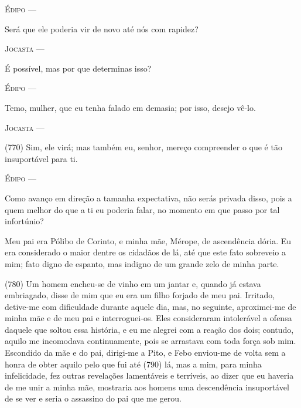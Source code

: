 \textsc{Édipo} ---

Será que ele poderia vir de novo até nós com rapidez?

\textsc{Jocasta} ---

É possível, mas por que determinas isso?

\textsc{Édipo} ---

Temo, mulher, que eu tenha falado em demasia; por isso, desejo vê-lo.

\textsc{Jocasta} ---

(770) Sim, ele virá; mas também eu, senhor, mereço compreender o que é
tão insuportável para ti.

\textsc{Édipo} ---

Como avanço em direção a tamanha expectativa, não serás privada disso,
pois a quem melhor do que a ti eu poderia falar, no momento em que passo
por tal infortúnio?

Meu pai era Pólibo de Corinto, e minha mãe, Mérope, de ascendência
dória. Eu era considerado o maior dentre os cidadãos de lá, até que este
fato sobreveio a mim; fato digno de espanto, mas indigno de um grande
zelo de minha parte.

(780) Um homem encheu-se de vinho em um jantar e, quando já estava
embriagado, disse de mim que eu era um filho forjado de meu pai.
Irritado, detive-me com dificuldade durante aquele dia, mas, no
seguinte, aproximei-me de minha mãe e de meu pai e interroguei-os. Eles
consideraram intolerável a ofensa daquele que soltou essa história, e eu
me alegrei com a reação dos dois; contudo, aquilo me incomodava
continuamente, pois se arrastava com toda força sob mim. Escondido da
mãe e do pai, dirigi-me a Pito, e Febo enviou-me de volta sem a honra de
obter aquilo pelo que fui até (790) lá, mas a mim, para minha
infelicidade, fez outras revelações lamentáveis e terríveis, ao dizer
que eu haveria de me unir a minha mãe, mostraria aos homens uma
descendência insuportável de se ver e seria o assassino do pai que me
gerou.

